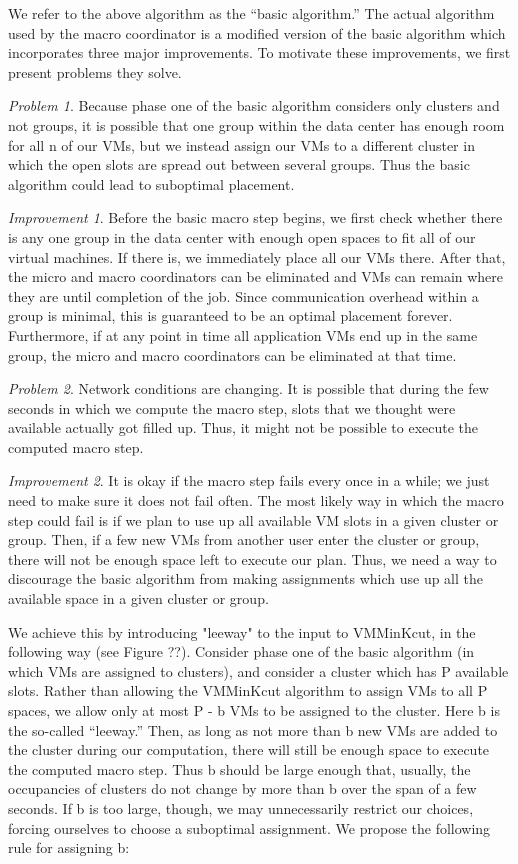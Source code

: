 \documentclass[11pt]{article}
\begin{document}
We refer to the above algorithm as the ``basic algorithm.''  The actual algorithm used by the macro coordinator is a modified version of the basic algorithm which incorporates three major improvements.  To motivate these improvements, we first present problems they solve.

\textit{Problem 1}. Because phase one of the basic algorithm considers only clusters and not groups, it is possible that one group within the data center has enough room for all n of our VMs, but we instead assign our VMs to a different cluster in which the open slots are spread out between several groups.  Thus the basic algorithm could lead to suboptimal placement.

\textit{Improvement 1}. Before the basic macro step begins, we first check whether there is any one group in the data center with enough open spaces to fit all of our virtual machines.  If there is, we immediately place all our VMs there.  After that, the micro and macro coordinators can be eliminated and VMs can remain where they are until completion of the job.  Since communication overhead within a group is minimal, this is guaranteed to be an optimal placement forever.  Furthermore, if at any point in time all application VMs end up in the same group, the micro and macro coordinators can be eliminated at that time.

\textit{Problem 2}. Network conditions are changing.  It is possible that during the few seconds in which we compute the macro step, slots that we thought were available actually got filled up.  Thus, it might not be possible to execute the computed macro step.

\textit{Improvement 2}. It is okay if the macro step fails every once in a while; we just need to make sure it does not fail often.  The most likely way in which the macro step could fail is if we plan to use up all available VM slots in a given cluster or group.  Then, if a few new VMs from another user enter the cluster or group, there will not be enough space left to execute our plan.  Thus, we need a way to discourage the basic algorithm from making assignments which use up all the available space in a given cluster or group.

We achieve this by introducing "leeway" to the input to VMMinKcut, in the following way (see Figure ??).  Consider phase one of the basic algorithm (in which VMs are assigned to clusters), and consider a cluster which has P available slots.  Rather than allowing the VMMinKcut algorithm to assign VMs to all P spaces, we allow only at most P - b VMs to be assigned to the cluster.  Here b is the so-called ``leeway.''  Then, as long as not more than b new VMs are added to the cluster during our computation, there will still be enough space to execute the computed macro step.  Thus b should be large enough that, usually, the occupancies of clusters do not change by more than b over the span of a few seconds.  If b is too large, though, we may unnecessarily restrict our choices, forcing ourselves to choose a suboptimal assignment.  We propose the following rule for assigning b:
\end{document}
